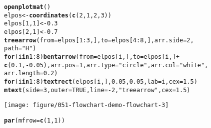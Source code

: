 \documentclass{article}\usepackage[]{graphicx}\usepackage[]{color}
\makeatletter
\def\maxwidth{ %
  \ifdim\Gin@nat@width>\linewidth
    \linewidth
  \else
    \Gin@nat@width
  \fi
}
\newcommand{\hlnum}[1]{\textcolor[rgb]{0.686,0.059,0.569}{#1}}%
\newcommand{\hlstr}[1]{\textcolor[rgb]{0.192,0.494,0.8}{#1}}%
\newcommand{\hlopt}[1]{\textcolor[rgb]{0,0,0}{#1}}%
\newcommand{\hlstd}[1]{\textcolor[rgb]{0.345,0.345,0.345}{#1}}%
\newcommand{\hlkwa}[1]{\textcolor[rgb]{0.161,0.373,0.58}{\textbf{#1}}}%
\newcommand{\hlkwb}[1]{\textcolor[rgb]{0.69,0.353,0.396}{#1}}%
\newcommand{\hlkwc}[1]{\textcolor[rgb]{0.333,0.667,0.333}{#1}}%
\newcommand{\hlkwd}[1]{\textcolor[rgb]{0.737,0.353,0.396}{\textbf{#1}}}%
\newenvironment{kframe}{%
 \def\at@end@of@kframe{}%
 \ifinner\ifhmode%
  \def\at@end@of@kframe{\end{minipage}}%
  \begin{minipage}{\columnwidth}%
 \fi\fi%
 \def\FrameCommand##1{\hskip\@totalleftmargin \hskip-\fboxsep
 \colorbox{shadecolor}{##1}\hskip-\fboxsep
     \hskip-\linewidth \hskip-\@totalleftmargin \hskip\columnwidth}%
 \MakeFramed {\advance\hsize-\width
   \@totalleftmargin\z@ \linewidth\hsize
   \@setminipage}}%
 {\par\unskip\endMakeFramed%
 \at@end@of@kframe}
\newenvironment{knitrout}{}{} %
\makeatother
\begin{document}
\begin{knitrout}
\begin{kframe}
\begin{alltt}
\hlkwd{openplotmat}\hlstd{()}
\hlstd{elpos} \hlkwb{<-} \hlkwd{coordinates}\hlstd{(}\hlkwd{c}\hlstd{(}\hlnum{2}\hlstd{,} \hlnum{1}\hlstd{,} \hlnum{2}\hlstd{,} \hlnum{3}\hlstd{))}
\hlstd{elpos[}\hlnum{1}\hlstd{,} \hlnum{1}\hlstd{]} \hlkwb{<-} \hlnum{0.3}
\hlstd{elpos[}\hlnum{2}\hlstd{,} \hlnum{1}\hlstd{]} \hlkwb{<-} \hlnum{0.7}
\hlkwd{treearrow}\hlstd{(}\hlkwc{from} \hlstd{= elpos[}\hlnum{1}\hlopt{:}\hlnum{3}\hlstd{, ],} \hlkwc{to} \hlstd{= elpos[}\hlnum{4}\hlopt{:}\hlnum{8}\hlstd{, ],} \hlkwc{arr.side} \hlstd{=} \hlnum{2}\hlstd{,}
    \hlkwc{path} \hlstd{=} \hlstr{"H"}\hlstd{)}
\hlkwa{for} \hlstd{(i} \hlkwa{in} \hlnum{1}\hlopt{:}\hlnum{8}\hlstd{)} \hlkwd{bentarrow}\hlstd{(}\hlkwc{from} \hlstd{= elpos[i, ],} \hlkwc{to} \hlstd{= elpos[i, ]} \hlopt{+}
    \hlkwd{c}\hlstd{(}\hlnum{0.1}\hlstd{,} \hlopt{-}\hlnum{0.05}\hlstd{),} \hlkwc{arr.pos} \hlstd{=} \hlnum{1}\hlstd{,} \hlkwc{arr.type} \hlstd{=} \hlstr{"circle"}\hlstd{,} \hlkwc{arr.col} \hlstd{=} \hlstr{"white"}\hlstd{,}
    \hlkwc{arr.length} \hlstd{=} \hlnum{0.2}\hlstd{)}
\hlkwa{for} \hlstd{(i} \hlkwa{in} \hlnum{1}\hlopt{:}\hlnum{8}\hlstd{)} \hlkwd{textrect}\hlstd{(elpos[i, ],} \hlnum{0.05}\hlstd{,} \hlnum{0.05}\hlstd{,} \hlkwc{lab} \hlstd{= i,} \hlkwc{cex} \hlstd{=} \hlnum{1.5}\hlstd{)}
\hlkwd{mtext}\hlstd{(}\hlkwc{side} \hlstd{=} \hlnum{3}\hlstd{,} \hlkwc{outer} \hlstd{=} \hlnum{TRUE}\hlstd{,} \hlkwc{line} \hlstd{=} \hlopt{-}\hlnum{2}\hlstd{,} \hlstr{"treearrow"}\hlstd{,} \hlkwc{cex} \hlstd{=} \hlnum{1.5}\hlstd{)}
\end{alltt}
\end{kframe}
\texttt{[image: figure/051-flowchart-demo-flowchart-3]} 
\begin{kframe}\begin{alltt}
\hlkwd{par}\hlstd{(}\hlkwc{mfrow} \hlstd{=} \hlkwd{c}\hlstd{(}\hlnum{1}\hlstd{,} \hlnum{1}\hlstd{))}


\end{alltt}
\end{kframe}
\end{knitrout}
\end{document}
